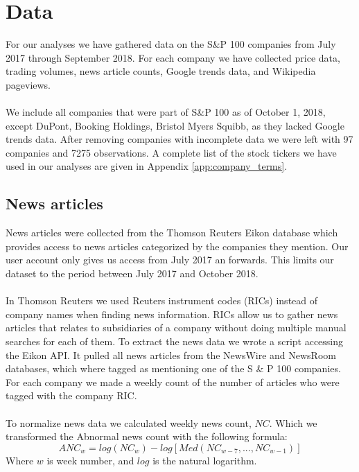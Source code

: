 
\chapter{Data}
For our analyses we have gathered data on the  S\&P 100 companies from July 2017 through September 2018. For each company we have collected price data, trading volumes, news article counts, Google trends data, and Wikipedia pageviews.  
\\\\
We include all companies that were part of S\&P 100 as of October 1, 2018, except DuPont, Booking Holdings, Bristol Myers Squibb, as they lacked Google trends data. After removing companies with incomplete data we were left with 97 companies and 7275 observations. A complete list of the stock tickers we have used in our analyses are given in Appendix \ref{app:company_terms}.


\section{News articles}
News articles were collected from the Thomson Reuters Eikon database which provides access to news articles categorized by the companies they mention. Our user account only gives us access from July 2017 an forwards. This limits our dataset to the period between July 2017 and October 2018.
\\\\
 In Thomson Reuters we used Reuters instrument codes (RICs) instead of company names when finding news information. RICs allow us to  gather news articles that relates to subsidiaries of a company without doing multiple manual searches for each of them. To extract the news data we wrote a script accessing the Eikon API. It pulled all news articles from the NewsWire and NewsRoom databases, which where tagged as mentioning  one of the S \& P 100 companies. For each company we made a weekly count of the number of articles who were tagged with the company RIC.
\\\\
To normalize news data we calculated weekly news count, $NC$. Which we transformed the Abnormal news count with the following formula:
\begin{equation}
   \label{abnormal_news} 
   ANC_{w} = log(NC_{w}) - log[Med(NC_{w-7},...,NC_{w-1})] 
\end{equation}
Where $w$ is week number, and $log$ is the natural logarithm.
\\\\
